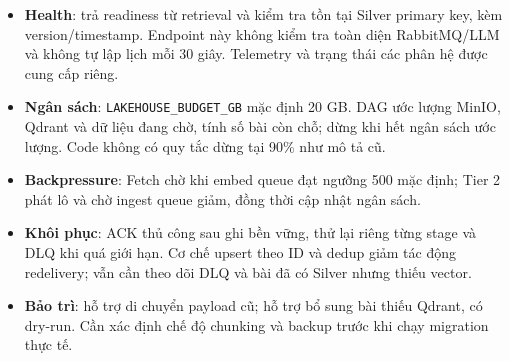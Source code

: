 \begin{itemize}
\item \textbf{Health}:  trả readiness từ retrieval và kiểm tra tồn tại Silver primary key, kèm version/timestamp. Endpoint này không kiểm tra toàn diện RabbitMQ/LLM và không tự lập lịch mỗi 30 giây. Telemetry và trạng thái các phân hệ được cung cấp riêng.
\item \textbf{Ngân sách}: \texttt{LAKEHOUSE\_BUDGET\_GB} mặc định 20 GB. DAG ước lượng MinIO, Qdrant và dữ liệu đang chờ, tính số bài còn chỗ; dừng khi hết ngân sách ước lượng. Code không có quy tắc dừng tại 90\% như mô tả cũ.
\item \textbf{Backpressure}: Fetch chờ khi embed queue đạt ngưỡng 500 mặc định; Tier 2 phát lô và chờ ingest queue giảm, đồng thời cập nhật ngân sách.
\item \textbf{Khôi phục}: ACK thủ công sau ghi bền vững, thử lại riêng từng stage và DLQ khi quá giới hạn. Cơ chế upsert theo ID và dedup giảm tác động redelivery; vẫn cần theo dõi DLQ và bài đã có Silver nhưng thiếu vector.
\item \textbf{Bảo trì}:  hỗ trợ di chuyển payload cũ;  hỗ trợ bổ sung bài thiếu Qdrant, có dry-run. Cần xác định chế độ chunking và backup trước khi chạy migration thực tế.
\end{itemize}
